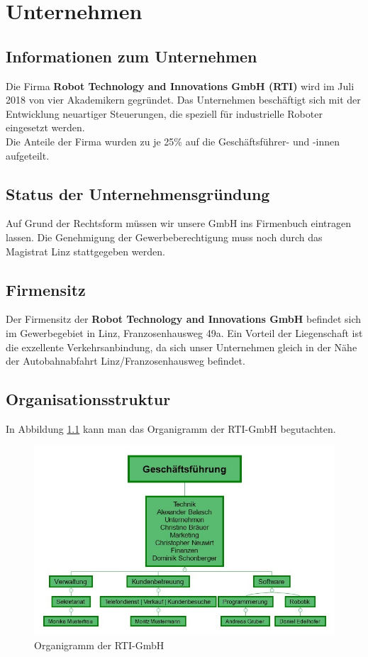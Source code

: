\chapter{Unternehmen}
\section{Informationen zum Unternehmen}
Die Firma \textbf{Robot Technology and Innovations GmbH (RTI)} wird im Juli 2018 von vier Akademikern gegründet. Das Unternehmen beschäftigt sich mit der Entwicklung neuartiger Steuerungen, die speziell für industrielle Roboter eingesetzt werden. \\
Die Anteile der Firma wurden zu je 25\% auf die Geschäftsführer- und -innen aufgeteilt. 



\section{Status der Unternehmensgründung}
Auf Grund der Rechtsform müssen wir unsere GmbH ins Firmenbuch eintragen lassen. Die Genehmigung der Gewerbeberechtigung muss noch durch das Magistrat Linz stattgegeben werden. 


\section{Firmensitz}
Der Firmensitz der \textbf{Robot Technology and Innovations GmbH}  befindet sich im Gewerbegebiet in Linz, Franzosenhausweg 49a. Ein Vorteil der Liegenschaft ist die exzellente Verkehrsanbindung, da sich unser Unternehmen gleich in der Nähe der Autobahnabfahrt Linz/Franzosenhausweg befindet. 

\section{Organisationsstruktur}
In Abbildung \ref{fig:organigrammrti} kann man das Organigramm der RTI-GmbH begutachten. 
\begin{figure}[h]
	\centering
	\includegraphics[width=1\linewidth]{Images/OrganigrammRTI}
	\caption{Organigramm der RTI-GmbH}
	\label{fig:organigrammrti}
\end{figure}

